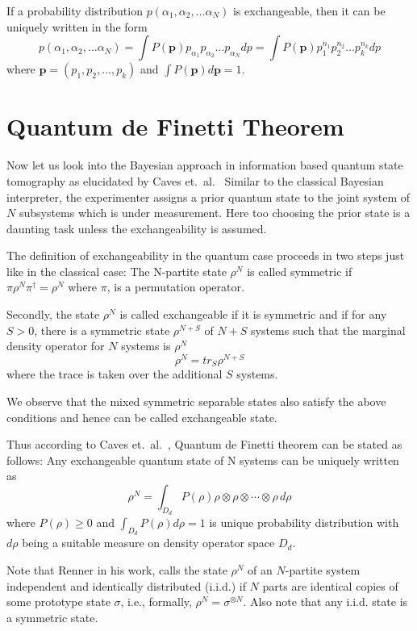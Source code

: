 If a probability distribution $p(\alpha_{1}, \alpha_{2}, \ldots \alpha_{N})$ is exchangeable, then it can be uniquely written in the form
$$
p(\alpha_{1}, \alpha_{2}, \ldots \alpha_{N}) = \int P(\textbf{p}) p_{\alpha_{1}} p_{\alpha_{2}} \ldots p_{\alpha_{N}}  dp = \int P(\textbf{p}) p_{1}^{n_{1}} p_{2}^{n_{2}} \ldots p_{k}^{n_{k}} dp
$$ 
where $\textbf{p} = (p_{1}, p_{2}, \ldots, p_{k} )$ and $\int P(\textbf{p}) d\textbf{p} = 1$.


\section{Quantum de Finetti Theorem}\label{chap27-sec3}

Now let us look into the Bayesian approach in information based quantum state tomography as elucidated by Caves et.\ al.\ \cite{chap27-key8} Similar to the classical Bayesian interpreter, the experimenter assigns a prior quantum state to the joint system of $N$ subsystems which is under measurement. Here too choosing the prior state is a daunting task unless the exchangeability is assumed.

The definition of exchangeability in the quantum case proceeds in two steps just like in the classical case:
The N-partite state $\rho^{N}$ is called symmetric if $\pi \rho^{N} \pi^{\dagger} = \rho^{N}$ where $\pi$, is a permutation operator.

Secondly, the state $\rho^{N}$ is called exchangeable if it is symmetric and if for any $S > 0$, there is a symmetric state $\rho^{N+S}$ of $N+S$ systems such that the marginal density operator for $N$ systems is $\rho^{N}$
$$
\rho^{N} = tr_{S} \rho^{N+S}
$$ 
where the trace is taken over the additional $S$ systems.

We observe that the mixed symmetric separable states also satisfy the above conditions and hence can be called exchangeable state.

Thus according to Caves et.\ al.\ \cite{chap27-key8}, Quantum de Finetti theorem can be stated as follows:
Any exchangeable quantum state of N systems can be uniquely written as 
$$
\rho^{N} = \int_{D_{d}} P(\rho) \rho \otimes \rho \otimes \cdots \otimes \rho\,d\rho
$$ 
where $P(\rho) \geq 0$ and $\int_{D_{d}} P(\rho) d\rho = 1$ is unique probability distribution with $d\rho$ being a suitable measure on density operator space $D_{d}$.

Note that Renner \cite{chap27-key1} in his work, calls the state $\rho^{N}$ of an $N$-partite system independent and identically distributed (i.i.d.) if $N$ parts are identical copies of some prototype state $\sigma$, i.e., formally, $\rho^{N} = \sigma^{\otimes N}$. Also note that any i.i.d. state is a symmetric state.


